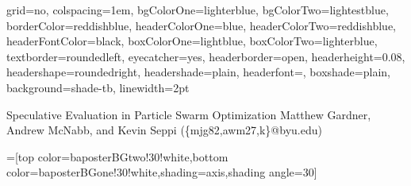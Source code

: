 \documentclass[portrait]{baposter}
\begin{document}

\begin{poster}{
  grid=no,
  colspacing=1em,
  bgColorOne=lighterblue,
  bgColorTwo=lightestblue,
  borderColor=reddishblue,
  headerColorOne=blue,
  headerColorTwo=reddishblue,
  headerFontColor=black,
  boxColorOne=lightblue,
  boxColorTwo=lighterblue,
  textborder=roundedleft,
  eyecatcher=yes,
  headerborder=open,
  headerheight=0.08\textheight,
  headershape=roundedright,
  headershade=plain,
  headerfont=\Large\textsf, %
  boxshade=plain,
  background=shade-tb,
  linewidth=2pt
  }
  {{\begin{minipage}{1em}
  \end{minipage}}
  }
  {\sf %
  Speculative Evaluation in Particle Swarm Optimization}
  {\sf %
  Matthew Gardner, Andrew McNabb, and Kevin Seppi
  (\{mjg82,awm27,k\}@byu.edu)
  }
  {{\begin{minipage}{1em}
    \hfill
  \end{minipage}}
  }

  =[top color=baposterBGtwo!30!white,bottom color=baposterBGone!30!white,shading=axis,shading angle=30]

     \newlength{\leftimgwidth}
     \setlength{\leftimgwidth}{0.78em+8.0em}

    \newcommand{\colouredcircle}[1]{%
      \tikz{\useasboundingbox (-0.2em,-0.32em) rectangle(0.2em,0.32em); \draw[draw=black,fill=baposterBGone!80!black!#1!white,line width=0.03em] (0,0) circle(0.18em);}}


\end{poster}
\end{document}
